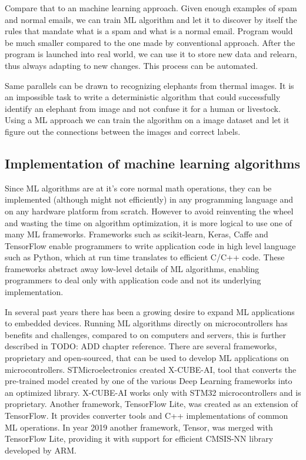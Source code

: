 Compare that to an machine learning approach. 
Given enough examples of spam and normal emails, we can train ML algorithm and let it to discover by itself the rules that mandate what is a spam and what is a normal email.
Program would be much smaller compared to the one made by conventional approach. 
After the program is launched into real world, we can use it to store new data and relearn, thus always adapting to new changes.
This process can be automated.

Same parallels can be drawn to recognizing elephants from thermal images.
It is an impossible task to write a deterministic algorithm that could successfully identify an elephant from image and not confuse it for a human or livestock. 
Using a ML approach we can train the algorithm on a image dataset and let it figure out the connections between the images and correct labels. 


\subsection{ Implementation of machine learning algorithms}

Since ML algorithms are at it's core normal math operations, they can be implemented (although might not efficiently) in any programming language and on any hardware platform from scratch.
However to avoid reinventing the wheel and wasting the time on algorithm optimization, it is more logical to use one of many ML frameworks.
Frameworks such as scikit-learn, Keras, Caffe and TensorFlow enable programmers to write application code in high level language such as Python, which at run time translates to efficient C/C++ code. 
These frameworks abstract away low-level details of ML algorithms, enabling programmers to deal only with application code and not its underlying implementation.

In several past years there has been a growing desire to expand ML applications to embedded devices.
Running ML algorithms directly on microcontrollers has benefits and challenges, compared to on computers and servers, this is further described in TODO: ADD chapter reference.
There are several frameworks, proprietary and open-sourced, that can be used to develop ML applications on microcontrollers.
STMicroelectronics created X-CUBE-AI, tool that converts the pre-trained model created by one of the various Deep Learning frameworks into an optimized library. 
X-CUBE-AI works only with STM32 microcontrollers and is proprietary.
Another framework, TensorFlow Lite, was created as an extension of TensorFlow.
It provides converter tools and C++ implementations of common ML operations.
In year 2019 another framework, \si{\micro}Tensor, was merged with TensorFlow Lite, providing it with support for efficient CMSIS-NN library developed by ARM.

